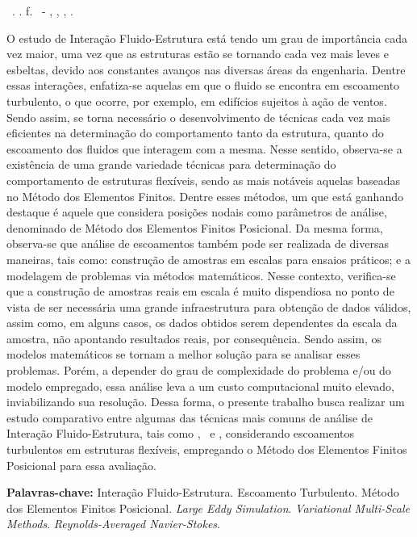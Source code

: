 \setlength{\absparsep}{18pt} %
\begin{resumo}
  \begin{flushleft}
    \setlength{\absparsep}{0pt} %
    \SingleSpacing
    \Autorabr\ \textbf{\Titulo}.	\the\year. \pageref{LastPage}f.
    \Tipotrabalho\ - \Unidademin, \Universidade, \Local, \the\year.
  \end{flushleft}
  \OnehalfSpacing

  O estudo de Interação Fluido-Estrutura está tendo um grau de importância cada vez maior, uma vez que as estruturas estão se tornando cada vez mais leves e esbeltas, devido aos constantes avanços nas diversas áreas da engenharia. Dentre essas interações, enfatiza-se aquelas em que o fluido se encontra em escoamento turbulento, o que ocorre, por exemplo, em edifícios sujeitos à ação de ventos. Sendo assim, se torna necessário o desenvolvimento de técnicas cada vez mais eficientes na determinação do comportamento tanto da estrutura, quanto do escoamento dos fluidos que interagem com a mesma. Nesse sentido, observa-se a existência de uma grande variedade técnicas para determinação do comportamento de estruturas flexíveis, sendo as mais notáveis aquelas baseadas no Método dos Elementos Finitos. Dentre esses métodos, um que está ganhando destaque é aquele que considera posições nodais como parâmetros de análise, denominado de Método dos Elementos Finitos Posicional. Da mesma forma, observa-se que análise de escoamentos também pode ser realizada de diversas maneiras, tais como: construção de amostras em escalas para ensaios práticos; e a modelagem de problemas via métodos matemáticos. Nesse contexto, verifica-se que a construção de amostras reais em escala é muito dispendiosa no ponto de vista de ser necessária uma grande infraestrutura para obtenção de dados válidos, assim como, em alguns casos, os dados obtidos serem dependentes da escala da amostra, não apontando resultados reais, por consequência. Sendo assim, os modelos matemáticos se tornam a melhor solução para se analisar esses problemas. Porém, a depender do grau de complexidade do problema e/ou do modelo empregado, essa análise leva a um custo computacional muito elevado, inviabilizando sua resolução. Dessa forma, o presente trabalho busca realizar um estudo comparativo entre algumas das técnicas mais comuns de análise de Interação Fluido-Estrutura, tais como \RANS, \LES\ e \VMS, considerando escoamentos turbulentos em estruturas flexíveis, empregando o Método dos Elementos Finitos Posicional para essa avaliação.

  \textbf{Palavras-chave:} Interação Fluido-Estrutura. Escoamento Turbulento. Método dos Elementos Finitos Posicional. \textit{Large Eddy Simulation}. \textit{Variational Multi-Scale Methods}. \textit{Reynolds-Averaged Navier-Stokes}.
\end{resumo}
